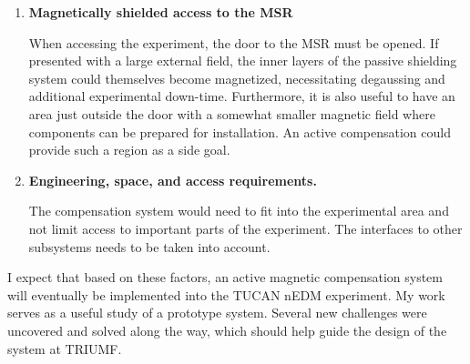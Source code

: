 \begin{enumerate}
    \item {\bf Magnetically shielded access to the MSR} 
    
    When accessing the experiment, the door to the MSR must be opened. If presented with a large external field, the inner layers of the passive shielding system could themselves become magnetized, necessitating degaussing and additional experimental down-time.  Furthermore, it is also useful to have an area just outside the door with a somewhat smaller magnetic field where components can be prepared for installation.  An active compensation could provide such a region as a side goal.

    \item {\bf Engineering, space, and access requirements.} 
    
    The compensation system would need to fit into the experimental area and not limit access to important parts of the experiment.  The interfaces to other subsystems needs to be taken into account.
\end{enumerate}

 I expect that based on these factors, an active magnetic compensation system will eventually be implemented into the TUCAN nEDM experiment. My work serves as a useful study of a prototype system. Several new challenges were uncovered and solved along the way, which should help guide the design of the system at TRIUMF.
 





